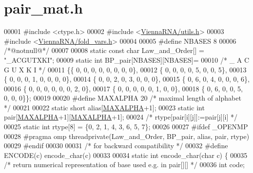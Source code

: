 \hypertarget{pair__mat_8h_source}{}\section{pair\+\_\+mat.\+h}
\label{pair__mat_8h_source}

\begin{DoxyCode}
00001 \textcolor{preprocessor}{#include <ctype.h>}
00002 \textcolor{preprocessor}{#include <\hyperlink{utils_8h}{ViennaRNA/utils.h}>}
00003 \textcolor{preprocessor}{#include <\hyperlink{fold__vars_8h}{ViennaRNA/fold\_vars.h}>}
00004 
00005 \textcolor{preprocessor}{#define NBASES 8}
00006 \textcolor{comment}{/*@notnull@*/}
00007 
00008 \textcolor{keyword}{static} \textcolor{keyword}{const} \textcolor{keywordtype}{char} Law\_and\_Order[] = \textcolor{stringliteral}{"\_ACGUTXKI"};
00009 \textcolor{keyword}{static} \textcolor{keywordtype}{int} BP\_pair[NBASES][NBASES]=
00010 \textcolor{comment}{/* \_  A  C  G  U  X  K  I */}
00011 \{\{ 0, 0, 0, 0, 0, 0, 0, 0\},
00012  \{ 0, 0, 0, 0, 5, 0, 0, 5\},
00013  \{ 0, 0, 0, 1, 0, 0, 0, 0\},
00014  \{ 0, 0, 2, 0, 3, 0, 0, 0\},
00015  \{ 0, 6, 0, 4, 0, 0, 0, 6\},
00016  \{ 0, 0, 0, 0, 0, 0, 2, 0\},
00017  \{ 0, 0, 0, 0, 0, 1, 0, 0\},
00018  \{ 0, 6, 0, 0, 5, 0, 0, 0\}\};
00019 
00020 \textcolor{preprocessor}{#define MAXALPHA 20       }\textcolor{comment}{/* maximal length of alphabet */}\textcolor{preprocessor}{}
00021 
00022 \textcolor{keyword}{static} \textcolor{keywordtype}{short} alias[\hyperlink{group__model__details_ga05a5ffe718aa431d97419a12fb082379}{MAXALPHA}+1];
00023 \textcolor{keyword}{static} \textcolor{keywordtype}{int} pair[\hyperlink{group__model__details_ga05a5ffe718aa431d97419a12fb082379}{MAXALPHA}+1][\hyperlink{group__model__details_ga05a5ffe718aa431d97419a12fb082379}{MAXALPHA}+1];
00024 \textcolor{comment}{/* rtype[pair[i][j]]:=pair[j][i] */}
00025 \textcolor{keyword}{static} \textcolor{keywordtype}{int} rtype[8] = \{0, 2, 1, 4, 3, 6, 5, 7\};
00026 
00027 \textcolor{preprocessor}{#ifdef \_OPENMP}
00028 \textcolor{preprocessor}{#pragma omp threadprivate(Law\_and\_Order, BP\_pair, alias, pair, rtype)}
00029 \textcolor{preprocessor}{#endif}
00030 
00031 \textcolor{comment}{/* for backward compatibility */}
00032 \textcolor{preprocessor}{#define ENCODE(c) encode\_char(c)}
00033 
00034 \textcolor{keyword}{static} \textcolor{keywordtype}{int} encode\_char(\textcolor{keywordtype}{char} c) \{
00035   \textcolor{comment}{/* return numerical representation of base used e.g. in pair[][] */}
00036   \textcolor{keywordtype}{int} code;

\end{DoxyCode}
